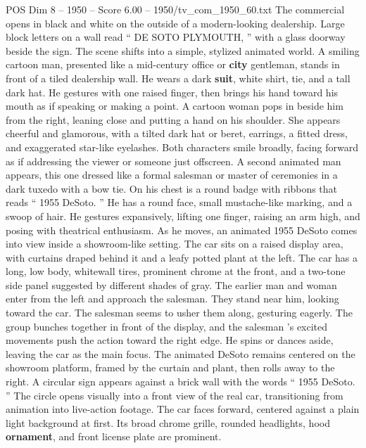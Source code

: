 \begin{textsample}{POS Dim 8 – 1950 – Score 6.00 – 1950/tv\_com\_1950\_60.txt}  \label{ex:f8_pos_073}
The commercial opens in black and white on the outside of a modern-looking dealership.
Large block letters on a wall read “ DE SOTO PLYMOUTH, ” with a glass doorway beside the sign.
The scene shifts into a simple, stylized animated world.
A smiling cartoon man, presented like a mid-century office or \textbf{city} gentleman, stands in front of a tiled dealership wall.
He wears a dark \textbf{suit}, white shirt, tie, and a tall dark hat.
He gestures with one raised finger, then brings his hand toward his mouth as if speaking or making a point.
A cartoon woman pops in beside him from the right, leaning close and putting a hand on his shoulder.
She appears cheerful and glamorous, with a tilted dark hat or beret, earrings, a fitted dress, and exaggerated star-like eyelashes.
Both characters smile broadly, facing forward as if addressing the viewer or someone just offscreen.
A second animated man appears, this one dressed like a formal salesman or master of ceremonies in a dark tuxedo with a bow tie.
On his chest is a round badge with ribbons that reads “ 1955 DeSoto. ” He has a round face, small mustache-like marking, and a swoop of hair.
He gestures expansively, lifting one finger, raising an arm high, and posing with theatrical enthusiasm.
As he moves, an animated 1955 DeSoto comes into view inside a showroom-like setting.
The car sits on a raised display area, with curtains draped behind it and a leafy potted plant at the left.
The car has a long, low body, whitewall tires, prominent chrome at the front, and a two-tone side panel suggested by different shades of gray.
The earlier man and woman enter from the left and approach the salesman.
They stand near him, looking toward the car.
The salesman seems to usher them along, gesturing eagerly.
The group bunches together in front of the display, and the salesman ’s excited movements push the action toward the right edge.
He spins or dances aside, leaving the car as the main focus.
The animated DeSoto remains centered on the showroom platform, framed by the curtain and plant, then rolls away to the right.
A circular sign appears against a brick wall with the words “ 1955 DeSoto. ” The circle opens visually into a front view of the real car, transitioning from animation into live-action footage.
The car faces forward, centered against a plain light background at first.
Its broad chrome grille, rounded headlights, hood \textbf{ornament}, and front license plate are prominent.

\end{textsample}
